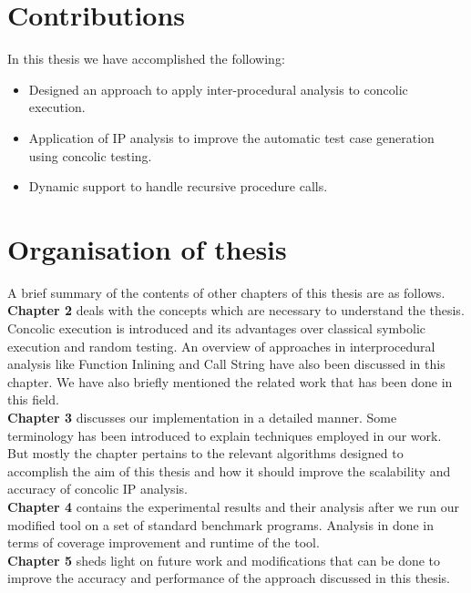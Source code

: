 \documentclass[12pt,oneside]{book}
\begin{document}

\section {Contributions}
In this thesis we have accomplished the following:
\begin{itemize}
  \item Designed an approach to apply inter-procedural analysis to concolic execution. 
  \item Application of IP analysis to improve the automatic test case generation using concolic testing.
  \item Dynamic support to handle recursive procedure calls. 
\end{itemize}


\section {Organisation of thesis}
A brief summary of the contents of other chapters of this thesis are as follows.\\

\textbf{Chapter 2} deals with the concepts which are necessary to understand the thesis. Concolic execution is introduced and its advantages over classical symbolic execution and random testing. An overview of approaches in interprocedural analysis like Function Inlining and Call String have also been discussed in this chapter. We have also briefly mentioned the related work that has been done in this field. \\

\textbf{Chapter 3} discusses our implementation in a detailed manner. Some terminology has been introduced to explain techniques employed in our work. But mostly the chapter pertains to the relevant algorithms designed to accomplish the aim of this thesis and how it should improve the scalability and accuracy of concolic IP analysis.\\

\textbf{Chapter 4} contains the experimental results and their analysis after we run our modified tool on a set of standard benchmark programs. Analysis in done in terms of coverage improvement and runtime of the tool.\\

\textbf{Chapter 5} sheds light on future work and modifications that can be done to improve the accuracy and performance of the approach discussed in this thesis.
\end{document}
